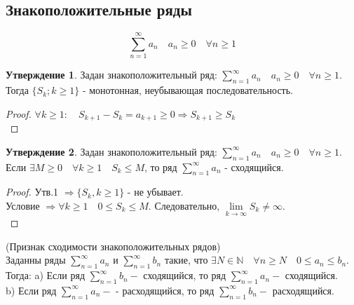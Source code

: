 \documentclass[14pt,a4paper]{scrartcl}
\theoremstyle{definition}
\theoremstyle{remark}
\theoremstyle{definition}
\theoremstyle{definition}
\newtheorem{statement}{Утверждение}[section]
\begin{document}
\subsection{Знакоположительные ряды}
$$ \sum\limits_{n = 1}^{ \infty}{a_n} \quad a_n \geq 0 \quad \forall n\geq 1$$
\begin{statement}
  Задан знакоположительный ряд:
  $ \sum\limits_{n = 1}^{ \infty}{a_n} \quad a_n \geq 0 \quad \forall n\geq 1$.\\ Тогда $\{ S_k; k\geq 1 \}$ - монотонная, неубывающая последовательность.\\

\end{statement}

\begin{proof}
 $\forall k\geq 1 : \quad S_{k+1} - S_k = a_{k+1} \geq 0 \Rightarrow S_{k+1} \geq S_k $\\
\end{proof}

\begin{statement}
Задан знакоположительный ряд:
$ \sum\limits_{n = 1}^{ \infty}{a_n} \quad a_n \geq 0 \quad \forall n\geq 1$.\\
Если $\exists M\geq 0 \quad \forall k\geq 1 \quad S_k\leq M$, то ряд $ \sum\limits_{n = 1}^{ \infty}{a_n} $ - сходящийся.
\end{statement}
\begin{proof}
 Утв.1 $\Longrightarrow \lbrace S_k, k\geq 1 \rbrace  $ - не убывает.\\
 Условие  $\Longrightarrow \forall k\geq 1 \quad 0\leq S_k \leq M $.
 Следовательно, $ \lim\limits_{k\to  \infty}{S_k} \neq \infty $.\\
\end{proof}

\begin{boxteo}(Признак сходимости знакоположительных рядов)\\
Заданны ряды $ \sum\limits_{n = 1}^{ \infty}{a_n} $ и $
               \sum\limits_{n = 1}^{ \infty}{b_n} $
такие, что $\exists N \in \mathbb{N} \quad \forall n\geq N \quad 0\leq  a_n\leq b_n$.\\ Тогда:
a) Если ряд $ \sum\limits_{n = 1}^{ \infty}{b_n} - $ сходящийся, то ряд $ \sum\limits_{n = 1}^{ \infty}{a_n} -$ сходящийся.\\
b) Если ряд $ \sum\limits_{n = 1}^{ \infty}{a_n} -$  - расходящийся, то ряд $ \sum\limits_{n = 1}^{ \infty}{b_n} -$ расходящийся.
\end{boxteo}
\end{document}
